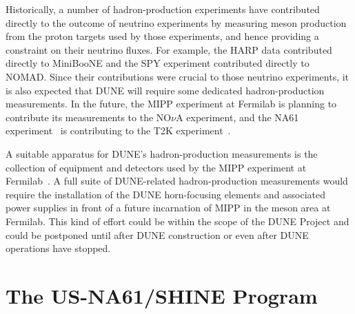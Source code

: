Historically, a number of hadron-production experiments have
contributed directly to the outcome of neutrino experiments
by measuring meson production from the proton targets used
by those experiments, and hence providing a constraint on their neutrino fluxes. 
For example, the HARP data\cite{ref:HARP} contributed directly to
MiniBooNE and the SPY\cite{ref:SPY} experiment contributed directly to
NOMAD. Since their contributions were crucial to those neutrino experiments, 
it is also expected that DUNE will require some dedicated hadron-production measurements.
In the future, the MIPP experiment at Fermilab is planning to contribute its
measurements to the NO$\nu$A experiment, and the NA61
experiment~\cite{Abgrall:2011ae, Abgrall:2011ts} is contributing to the T2K
experiment~\cite{Abe:2012av}.

A suitable apparatus for DUNE's hadron-production measurements
is the collection of equipment and detectors used by the MIPP experiment at Fermilab~\cite{Isenhower:2006zp}.   
A full suite of DUNE-related
hadron-production measurements would require the installation of the DUNE horn-focusing
elements and associated power supplies in front of a future
incarnation of MIPP in the meson area at Fermilab.
This kind of effort could be within the scope of the DUNE Project and could be postponed
until after DUNE construction or even after DUNE operations have
stopped. 


\section{The US-NA61/SHINE Program}
\label{sec:nd-external-usna61}

